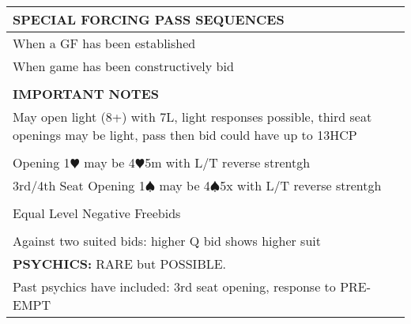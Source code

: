 \documentclass{article}
\renewcommand\H{\color{red}\ensuremath{\varheartsuit}}
\renewcommand\S{\ensuremath{\spadesuit}}
\begin{document}
\begin{minipage}{90mm}
\begin{tabular}{| p{88mm} |}
		\cellcolor{orange!25}\textbf{SPECIAL FORCING PASS SEQUENCES} \\ \hline
		When a GF has been established\\ \hline
		When game has been constructively bid\\ \hline
		\\ \hline
		\cellcolor{orange!25}\textbf{IMPORTANT NOTES} \\ \hline
		May open light (8+) with 7L, light responses possible, 
		third seat openings may be light,		
		pass then bid could have up to 13HCP\\ \hline
		\\ \hline		
		Opening 1{\H} may be 4{\H}5m with L/T reverse strentgh\\ \hline
		3rd/4th Seat Opening 1{\S} may be 4{\S}5x with L/T reverse strentgh\\ \hline
		\\ \hline
		Equal Level Negative Freebids\\ \hline
		\\ \hline
		Against two suited bids: higher Q bid shows higher suit \\ \hline

		\cellcolor{orange!25}\textbf{PSYCHICS:} RARE but POSSIBLE.  \\ \hline
		Past psychics have included: 3rd seat opening, response to PRE-EMPT \\ \hline
	\end{tabular}
\end{minipage}
\end{document}
